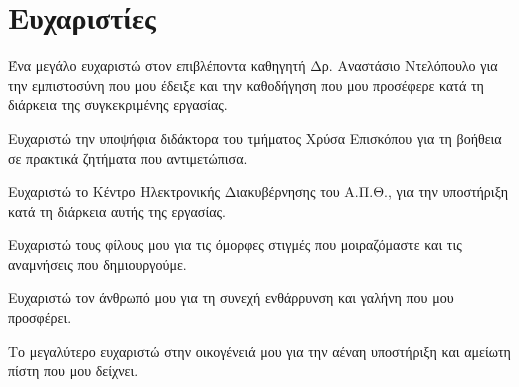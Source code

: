 \vspace*{\fill} %
\section*{Ευχαριστίες}
\label{Acknowledgements}

Ένα μεγάλο ευχαριστώ στον επιβλέποντα καθηγητή Δρ. Αναστάσιο Ντελόπουλο για την εμπιστοσύνη που μου έδειξε και την καθοδήγηση που μου προσέφερε κατά τη διάρκεια της συγκεκριμένης εργασίας.

Ευχαριστώ την υποψήφια διδάκτορα του τμήματος Χρύσα Επισκόπου για τη βοήθεια σε πρακτικά ζητήματα που αντιμετώπισα.

Ευχαριστώ το Κέντρο Ηλεκτρονικής Διακυβέρνησης του Α.Π.Θ., για την υποστήριξη κατά τη διάρκεια αυτής της εργασίας.

Ευχαριστώ τους φίλους μου για τις όμορφες στιγμές που μοιραζόμαστε και τις αναμνήσεις που δημιουργούμε.

Ευχαριστώ τον άνθρωπό μου για τη συνεχή ενθάρρυνση και γαλήνη που μου προσφέρει.

Το μεγαλύτερο ευχαριστώ στην οικογένειά μου για την αέναη υποστήριξη και αμείωτη πίστη που μου δείχνει.

\vspace*{\fill}
